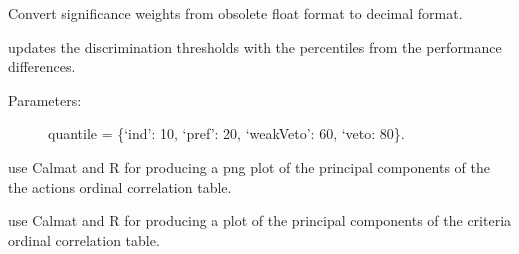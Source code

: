 \documentclass[letterpaper,10pt,english]{sphinxmanual}
\begin{document}
\begin{fulllineitems}
\begin{fulllineitems}
\label{techDoc:outrankingDigraphs.OutrankingDigraph.convertWeightFloatToDecimal}
Convert significance weights from obsolete float format
to decimal format.

\end{fulllineitems}


\begin{fulllineitems}
\label{techDoc:outrankingDigraphs.OutrankingDigraph.defaultDiscriminationThresholds}
updates the discrimination thresholds with the percentiles
from the performance differences.
\begin{description}
\item[{Parameters:}] \leavevmode
quantile = \{`ind': 10, `pref': 20, `weakVeto': 60, `veto: 80\}.

\end{description}

\end{fulllineitems}


\begin{fulllineitems}
\label{techDoc:outrankingDigraphs.OutrankingDigraph.export3DplotOfActionsCorrelation}
use Calmat and R for producing a png plot of the principal components of
the the actions ordinal correlation table.

\end{fulllineitems}


\begin{fulllineitems}
\label{techDoc:outrankingDigraphs.OutrankingDigraph.export3DplotOfCriteriaCorrelation}
use Calmat and R for producing a plot of the principal components of
the criteria ordinal correlation table.


\end{fulllineitems}
\end{fulllineitems}
\end{document}
